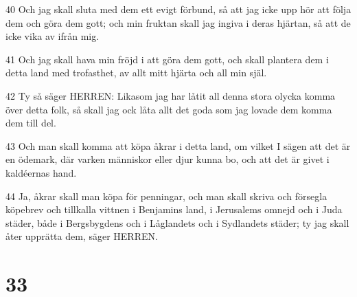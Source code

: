 \par 40 Och jag skall sluta med dem ett evigt förbund, så att jag icke upp hör att följa dem och göra dem gott; och min fruktan skall jag ingiva i deras hjärtan, så att de icke vika av ifrån mig.
\par 41 Och jag skall hava min fröjd i att göra dem gott, och skall plantera dem i detta land med trofasthet, av allt mitt hjärta och all min själ.
\par 42 Ty så säger HERREN: Likasom jag har låtit all denna stora olycka komma över detta folk, så skall jag ock låta allt det goda som jag lovade dem komma dem till del.
\par 43 Och man skall komma att köpa åkrar i detta land, om vilket I sägen att det är en ödemark, där varken människor eller djur kunna bo, och att det är givet i kaldéernas hand.
\par 44 Ja, åkrar skall man köpa för penningar, och man skall skriva och försegla köpebrev och tillkalla vittnen i Benjamins land, i Jerusalems omnejd och i Juda städer, både i Bergsbygdens och i Låglandets och i Sydlandets städer; ty jag skall åter upprätta dem, säger HERREN.

\chapter{33}

